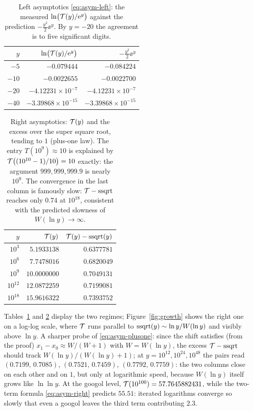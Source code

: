 \begin{table}[t]
\centering
\small
\caption{Left asymptotics \eqref{eq:asym-left}: the measured
$\ln\bigl(\mathcal{T}(y)/\mathrm{e}^{y}\bigr)$ against the prediction
$-\tfrac{y^{2}}{2}\ee^{y}$. By $y = -20$ the agreement is to five
significant digits.}
\label{tab:asym-left}
\begin{tabular}{rrr}
\toprule
$y$ & $\ln\bigl(\mathcal{T}(y)/\mathrm{e}^{y}\bigr)$ & $-\tfrac{y^{2}}{2}\ee^{y}$ \\
\midrule
$-5$  & $-0.079444$             & $-0.084224$ \\
$-10$ & $-0.0022655$            & $-0.0022700$ \\
$-20$ & $-4.12231 \times 10^{-7}$  & $-4.12231 \times 10^{-7}$ \\
$-40$ & $-3.39868 \times 10^{-15}$ & $-3.39868 \times 10^{-15}$ \\
\bottomrule
\end{tabular}
\end{table}

\begin{table}[t]
\centering
\small
\caption{Right asymptotics: $\mathcal{T}(y)$ and the excess over the super
square root, tending to $1$ (plus-one law). The entry $T(10^{9})
\approx 10$ is explained by
$\mathcal{T}\bigl((10^{10}-1)/10\bigr) = 10$ exactly: the argument
$999{,}999{,}999.9$ is nearly $10^{9}$. The convergence in the last
column is famously slow: $\mathcal{T} - \operatorname{ssqrt}$ reaches only $0.74$ at
$10^{18}$, consistent with the predicted slowness of
$W(\ln y) \to \infty$.}
\label{tab:asym-right}
\begin{tabular}{rrr}
\toprule
$y$ & $\mathcal{T}(y)$ & $\mathcal{T}(y) - \operatorname{ssqrt}(y)$ \\
\midrule
$10^{3}$  & $5.1933138$   & $0.6377781$ \\
$10^{6}$  & $7.7478016$   & $0.6820049$ \\
$10^{9}$  & $10.0000000$  & $0.7049131$ \\
$10^{12}$ & $12.0872259$  & $0.7199081$ \\
$10^{18}$ & $15.9616322$  & $0.7393752$ \\
\bottomrule
\end{tabular}
\end{table}

Tables~\ref{tab:asym-left} and \ref{tab:asym-right} display the two
regimes; Figure~\ref{fig:growth} shows the right one on a log-log
scale, where $\mathcal{T}$ runs parallel to $\operatorname{ssqrt}(y) \sim \ln y/W(\ln y)$
and visibly above $\ln y$. A sharper probe of \eqref{eq:asym-plusone}:
since the shift satisfies (from the proof)
$x_{1} - x_{0} \approx W/(W+1)$ with $W = W(\ln y)$, the excess
$\mathcal{T} - \operatorname{ssqrt}$ should track $W(\ln y)/(W(\ln y)+1)$; at
$y = 10^{12}, 10^{24}, 10^{48}$ the pairs read
$(0.7199,\, 0.7085)$, $(0.7521,\, 0.7459)$, $(0.7792,\, 0.7759)$:
the two columns close on each other and on $1$, but only at
logarithmic speed, because $W(\ln y)$ itself grows like
$\ln\ln y$. At the googol level, $\mathcal{T}(10^{100}) = 57.7645882431$,
while the two-term formula \eqref{eq:asym-right} predicts $55.51$:
iterated logarithms converge so slowly that even a googol leaves the
third term contributing $2.3$.


